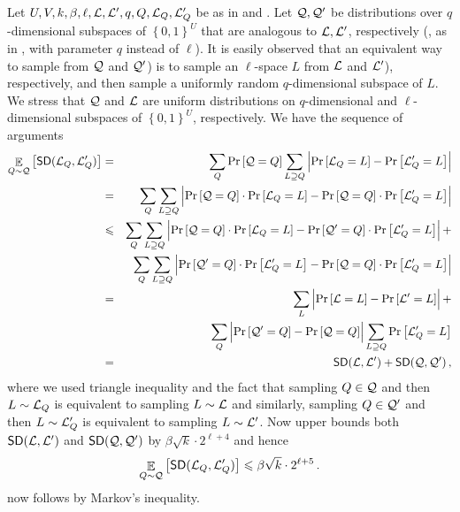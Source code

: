 \documentclass{toc}
\newcommand\set[1]{{\left\{ #1 \right\}}}
\newcommand\Prob[2]{{\Pr_{#1}\left[ {#2} \right]}}
\newcommand\power[1]{\set{0,1}^{#1}}
\newcommand\Expect[2]{{\mathop{\mathbb{E}}_{#1}\left[ {#2} \right]}}
\renewcommand\leq{\leqslant}
\begin{document}
Let $U, V, k, \beta, \ell, {\cal L}, {\cal L}', q, Q, {\cal L}_Q, {\cal L}'_Q$ be as in  and 
.  %
Let ${\cal Q}, {\cal Q}'$ be
distributions over $q$-dimensional subspaces of $\power{U}$ that are analogous to ${\cal L}, {\cal L}'$, respectively %
(\ie, as in , with
parameter $q$ instead of $\ell$). It is easily observed that an equivalent way to sample
%
%
from ${\cal Q}$ and ${\cal Q}'$) is to sample an $\ell$-space $L$
from ${\cal L}$ and ${\cal L}'$), respectively,  %
and then sample a uniformly random $q$-dimensional subspace of $L$.
We stress that ${\cal Q}$ and ${\cal L}$ are
uniform distributions on $q$-dimensional and $\ell$-dimensional subspaces
of $\power{U}$, respectively.  %
We have the sequence of arguments
\begin{eqnarray*}
\Expect{Q \sim {\cal Q}}{{\sf SD}({\cal L}_Q, {\cal L}'_Q) } & = & \sum_{Q} \Prob{}{{\cal Q}=Q} \sum_{L \supseteq Q} \left| \Prob{}{{\cal L}_Q = L} - \Prob{}{{\cal L}'_Q = L} \right| \\
 & = & \sum_{Q} \sum_{L \supseteq Q} \left|  \Prob{}{{\cal Q}=Q} \cdot \Prob{}{{\cal L}_Q = L} - \Prob{}{{\cal Q}=Q} \cdot \Prob{}{{\cal L}'_Q = L}       \right| \\
 & \leq &  \sum_{Q} \sum_{L \supseteq Q} \left|  \Prob{}{{\cal Q}=Q} \cdot \Prob{}{{\cal L}_Q = L} - \Prob{}{{\cal Q'}=Q} \cdot \Prob{}{{\cal L}'_Q = L}       \right| + \\
 &  &  \sum_{Q} \sum_{L \supseteq Q} \left|  \Prob{}{{\cal Q}'=Q} \cdot \Prob{}{{\cal L}'_Q = L} - \Prob{}{{\cal Q}=Q} \cdot \Prob{}{{\cal L}'_Q = L}       \right|  \\
 & = &  \sum_{L} \left| \Prob{}{{\cal L}=L} - \Prob{}{{\cal L}' = L} \right|  + \\
 & & \sum_Q \left| \Prob{}{{\cal Q}'=Q} - \Prob{}{{\cal Q}=Q} \right| \sum_{L \supseteq Q} \Prob{}{{\cal L}'_Q = L} \\
 & = & {\sf SD}({\cal L}, {\cal L}') + {\sf SD}( {\cal Q}, {\cal Q}')\,,%
\end{eqnarray*}
where we used triangle inequality and the fact that sampling $Q \in {\cal Q}$ and then $L \sim {\cal L}_Q$ is equivalent to sampling $L \sim {\cal L}$ and
similarly, sampling $Q \in {\cal Q}'$ and then $L \sim {\cal L}'_Q$ is equivalent to sampling $L \sim {\cal L}'$.  Now  upper bounds both
${\sf SD}({\cal L}, {\cal L}')$ and $ {\sf SD}( {\cal Q}, {\cal Q}')$ by $\beta \sqrt{k} \cdot 2^{\ell+4}$ and hence
  $$ \Expect{Q \sim {\cal Q}}{{\sf SD}({\cal L}_Q, {\cal L}'_Q )} \leq  \beta \sqrt{k} \cdot 2^{\ell+5}\,.$$%
  now follows by
Markov's inequality.%
%
%
\end{document}
